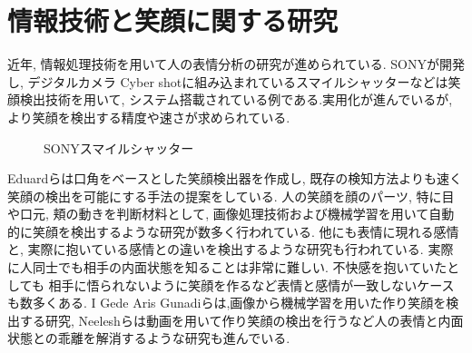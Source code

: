 \section{情報技術と笑顔に関する研究}
近年, 情報処理技術を用いて人の表情分析の研究が進められている.
SONYが開発し, デジタルカメラ Cyber shotに組み込まれているスマイルシャッターなどは笑顔検出技術を用いて,
システム搭載されている例である.実用化が進んでいるが, より笑顔を検出する精度や速さが求められている.
\begin{figure}[htbp]
    \begin{center}
    \end{center}
    \caption{SONYスマイルシャッター}
    \label{fig:sony_smile_shutter}
\end{figure}

Eduardらは口角をベースとした笑顔検出器を作成し, 既存の検知方法よりも速く笑顔の検出を可能にする手法の提案をしている.\cite{EduardRoyce}
人の笑顔を顔のパーツ, 特に目や口元, 頬の動きを判断材料として, 画像処理技術および機械学習を用いて自動的に笑顔を検出するような研究が数多く行われている.
他にも表情に現れる感情と, 実際に抱いている感情との違いを検出するような研究も行われている.
実際に人同士でも相手の内面状態を知ることは非常に難しい. 不快感を抱いていたとしても 相手に悟られないように笑顔を作るなど表情と感情が一致しないケースも数多くある.
I Gede Aris Gunadiらは,画像から機械学習を用いた作り笑顔を検出する研究\cite{IGedeArisGunadi}, Neeleshらは動画を用いて作り笑顔の検出\cite{NeeleshBhakt}を行うなど人の表情と内面状態との乖離を解消するような研究も進んでいる.

